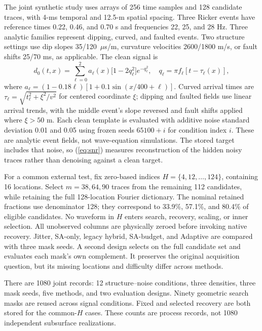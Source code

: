 \documentclass[journal]{IEEEtran}
\begin{document}
The joint synthetic study uses arrays of 256 time samples and 128 candidate traces, with 4-ms temporal and 12.5-m spatial spacing. Three Ricker events have reference times 0.22, 0.46, and 0.70 s and frequencies 22, 25, and 28 Hz. Three analytic families represent dipping, curved, and faulted events. Two structure settings use dip slopes 35/120~$\mu$s/m, curvature velocities 2600/1800 m/s, or fault shifts 25/70 ms, as applicable. The clean signal is
\begin{equation}
d_0(t,x)=\sum_{\ell=0}^{2}a_\ell(x)
\big[1-2q_\ell^2\big]e^{-q_\ell^2},\quad
q_\ell=\pi f_\ell[t-\tau_\ell(x)],
\end{equation}
where $a_\ell=(1-0.18\ell)[1+0.1\sin(x/400+\ell)]$. Curved arrival times are $\tau_\ell=\sqrt{t_\ell^2+\xi^2/v^2}$ for centered coordinate $\xi$; dipping and faulted fields use linear arrival trends, with the middle event's slope reversed and fault shifts applied where $\xi>50$ m. Each clean template is evaluated with additive noise standard deviation 0.01 and 0.05 using frozen seeds $65100+i$ for condition index $i$. These are analytic event fields, not wave-equation simulations. The stored target includes that noise, so (\ref{eq:snr}) measures reconstruction of the hidden noisy traces rather than denoising against a clean target.

For a common external test, fix zero-based indices $H=\{4,12,\ldots,124\}$, containing 16 locations. Select $m=38,64,90$ traces from the remaining 112 candidates, while retaining the full 128-location Fourier dictionary. The nominal retained fractions use denominator 128; they correspond to 33.9\%, 57.1\%, and 80.4\% of eligible candidates. No waveform in $H$ enters search, recovery, scaling, or inner selection. All unobserved columns are physically zeroed before invoking native recovery. Jitter, SA-only, legacy hybrid, SA-budget, and Adaptive are compared with three mask seeds. A second design selects on the full candidate set and evaluates each mask's own complement. It preserves the original acquisition question, but its missing locations and difficulty differ across methods.

There are 1080 joint records: 12 structure--noise conditions, three densities, three mask seeds, five methods, and two evaluation designs. Ninety geometric search masks are reused across signal conditions. Fixed and selected recovery are both stored for the common-$H$ cases. These counts are process records, not 1080 independent subsurface realizations.
\end{document}
